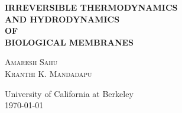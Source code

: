 


\begin{titlepage}

	\vspace*{2cm}
	\centering

	{\bfseries \LARGE IRREVERSIBLE THERMODYNAMICS\\[8pt] AND HYDRODYNAMICS\\[5pt] OF\\[15pt] BIOLOGICAL MEMBRANES}

	\vspace{3cm}
	{\large \textsc{
		Amaresh Sahu\\[5pt]
		Kranthi K. Mandadapu
	}}

	\vfill
	University of California at Berkeley\\[2pt]
	\today
	
\end{titlepage}




